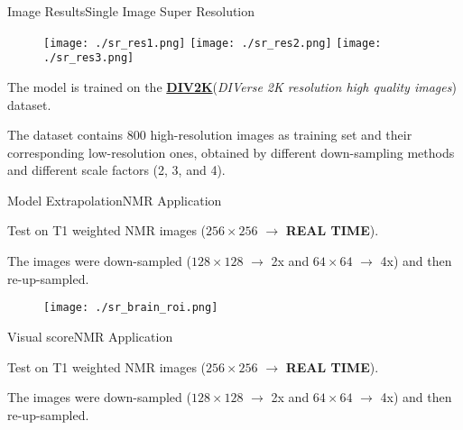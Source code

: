 \documentclass{standalone}
\begin{document}
\begin{frame}{Image Results}{Single Image Super Resolution}

  \begin{figure}
    \begin{overprint}
      \centering\texttt{[image: ./sr\_res1.png]}
      \centering\texttt{[image: ./sr\_res2.png]}
      \centering\texttt{[image: ./sr\_res3.png]}
    \end{overprint}
  \end{figure}

  \scriptsize{The model is trained on the \href{www.vision.ee.ethz.ch/~timofter/publications/Agustsson-CVPRW-2017.pdf}{\textbf{DIV2K}}(\emph{DIVerse 2K resolution high quality images}) dataset.}

  \scriptsize{The dataset contains 800 high-resolution images as training set and their corresponding low-resolution ones, obtained by different down-sampling methods and different scale factors (2, 3, and 4).}

\end{frame}


\begin{frame}{Model Extrapolation}{NMR Application}

  \scriptsize{Test on T1 weighted NMR images ($256\times 256$ $\rightarrow$ \textbf{REAL TIME}).}

  \scriptsize{The images were down-sampled ($128\times 128$ $\rightarrow$ 2x and $64\times 64$ $\rightarrow$ 4x) and then re-up-sampled.}

  \begin{figure}

    \begin{overprint}
      \centering\texttt{[image: ./sr\_brain\_roi.png]}
      \centering\def\svgwidth{0.6\linewidth}
    \end{overprint}

  \end{figure}

\end{frame}

\begin{frame}{Visual score}{NMR Application}

  \scriptsize{Test on T1 weighted NMR images ($256\times 256$ $\rightarrow$ \textbf{REAL TIME}).}

  \scriptsize{The images were down-sampled ($128\times 128$ $\rightarrow$ 2x and $64\times 64$ $\rightarrow$ 4x) and then re-up-sampled.}

  \centering{}

\end{frame}
\end{document}
